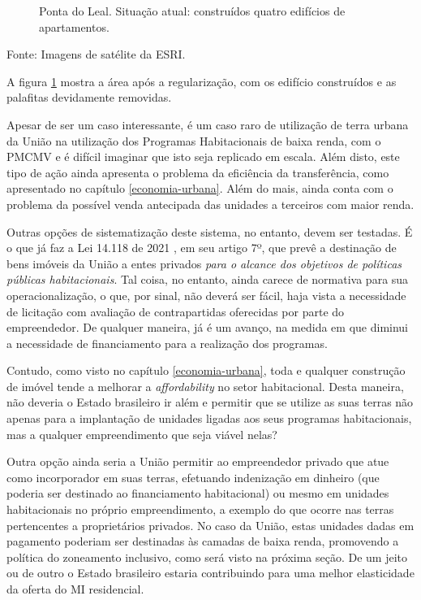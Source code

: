 \documentclass[
	12pt,				%
	oneside,			%
	a4paper,			%
	chapter=TITLE,		%
	section=TITLE,		%
	english,			%
	brazil				%
	]{abntex2}
\newcommand{\bcenter}{\begin{center}}
\newcommand{\ecenter}{\end{center}}
\begin{document}
\begin{refsection}
\begin{figure}[H]
{}

\caption{Ponta do Leal. Situação atual: construídos quatro edifícios de apartamentos.}\label{fig:ponta-leal-depois}
\end{figure}
\bcenter

Fonte: Imagens de satélite da ESRI.
\ecenter

A figura \ref{fig:ponta-leal-depois} mostra a área após a regularização, com os
edifício construídos e as palafitas devidamente removidas.

Apesar de ser um caso interessante, é um caso raro de utilização de terra urbana
da União na utilização dos Programas Habitacionais de baixa renda, com o
\gls{PMCMV} e é difícil imaginar que isto seja replicado em escala. Além disto,
este tipo de ação ainda apresenta o problema da eficiência da transferência,
como apresentado no capítulo \ref{economia-urbana}. Além do mais, ainda conta
com o problema da possível venda antecipada das unidades a terceiros com maior
renda.

Outras opções de sistematização deste sistema, no entanto, devem ser testadas. É
o que já faz a Lei 14.118 de 2021 \autocite{lei14118}, em seu artigo 7º, que prevê a
destinação de bens imóveis da União a entes privados \emph{para o alcance dos
objetivos de políticas públicas habitacionais}. Tal coisa, no entanto, ainda
carece de normativa para sua operacionalização, o que, por sinal, não deverá ser
fácil, haja vista a necessidade de licitação com avaliação de contrapartidas
oferecidas por parte do empreendedor. De qualquer maneira, já é um avanço, na
medida em que diminui a necessidade de financiamento para a realização dos
programas.

Contudo, como visto no capítulo \ref{economia-urbana}, toda e qualquer
construção de imóvel tende a melhorar a \emph{affordability} no setor habitacional.
Desta maneira, não deveria o Estado brasileiro ir além e permitir que se utilize
as suas terras não apenas para a implantação de unidades ligadas aos seus
programas habitacionais, mas a qualquer empreendimento que seja viável nelas?

Outra opção ainda seria a União permitir ao empreendedor privado que atue como
incorporador em suas terras, efetuando indenização em dinheiro (que poderia ser
destinado ao financiamento habitacional) ou mesmo em unidades habitacionais no
próprio empreendimento, a exemplo do que ocorre nas terras pertencentes a
proprietários privados. No caso da União, estas unidades dadas em pagamento
poderiam ser destinadas às camadas de baixa renda, promovendo a política do
zoneamento inclusivo, como será visto na próxima seção. De um jeito ou de outro
o Estado brasileiro estaria contribuindo para uma melhor elasticidade da oferta
do \gls{MI} residencial.


\end{refsection}
\end{document}
